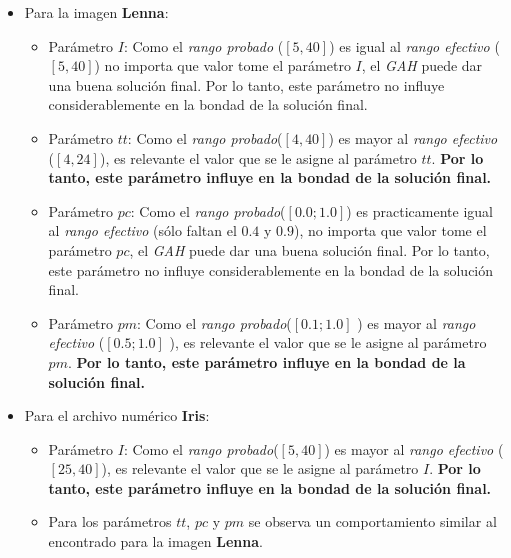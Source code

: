 \begin{itemize}
    \item Para la imagen \textbf{Lenna}:
        \begin{itemize}
            \item Parámetro $I$:
                Como el \emph{rango probado} ($[5, 40]$) es
                igual al \emph{rango efectivo} ($[5, 40]$) no importa que valor tome el
                parámetro $I$, el \emph{GAH} puede dar una buena solución
                final. Por lo tanto, este parámetro no influye
                considerablemente en la bondad de la solución final.
            \item Parámetro $tt$:
                Como el \emph{rango probado}($[4, 40]$) es
                mayor al \emph{rango efectivo} ($[4, 24]$), es relevante el valor que se
                le asigne al parámetro $tt$. \textbf{Por lo tanto, este
                parámetro influye en la bondad de la solución final.}
            \item Parámetro $pc$:
                Como el \emph{rango probado}($[0.0; 1.0]$) es
                practicamente igual al \emph{rango efectivo} (sólo faltan el $0.4$ y $0.9$), 
                no importa que valor tome el
                parámetro $pc$, el \emph{GAH} puede dar una buena solución
                final. Por lo tanto, este parámetro no influye
                considerablemente en la bondad de la solución final.
            \item Parámetro $pm$:
                Como el \emph{rango probado}($[0.1; 1.0]$ ) es
                mayor al \emph{rango efectivo} ($[0.5; 1.0]$ ), es relevante el valor que se
                le asigne al parámetro $pm$. \textbf{Por lo tanto, este
                parámetro influye en la bondad de la solución final.}
        \end{itemize}
	\item Para el archivo numérico \textbf{Iris}:
        \begin{itemize}
            \item Parámetro $I$:
                Como el \emph{rango probado}($[5, 40]$) es
                mayor al \emph{rango efectivo} ($[25, 40]$), es relevante el valor que se
                le asigne al parámetro $I$. \textbf{Por lo tanto, este
                parámetro influye en la bondad de la solución final.}
			\item Para los parámetros $tt$, $pc$ y $pm$ se observa un comportamiento
				similar al encontrado para la imagen \textbf{Lenna}.
        \end{itemize}
\end{itemize}

